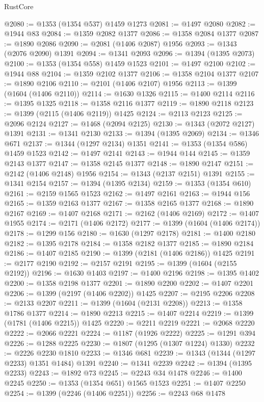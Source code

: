 \begin{lexlean}{RustCore}
\begin{coremodule}
@2080 := @1353 (@1354 @537) @1459 @1273
@2081 := @1497 @2080
@2082 := @1944 @83
@2084 := @1359 @2082 @1377
@2086 := @1358 @2084 @1377
@2087 := @1890 @2086
@2090 := @2081 (@1406 @2087) @1956
@2093 := @1343 (@2076 @2090) @1391
@2094 := @1341 @2093
@2096 := @1394 (@1395 @2073)
@2100 := @1353 (@1354 @558) @1459 @1523
@2101 := @1497 @2100
@2102 := @1944 @88
@2104 := @1359 @2102 @1377
@2106 := @1358 @2104 @1377
@2107 := @1890 @2106
@2110 := @2101 (@1406 @2107) @1956
@2113 := @1399 (@1604 (@1406 @2110))
@2114 := @1630 @1326
@2115 := @1400 @2114
@2116 := @1395 @1325
@2118 := @1358 @2116 @1377
@2119 := @1890 @2118
@2123 := @1399 (@2115 (@1406 @2119)) @1425
@2124 := @2113 @2123
@2125 := @2096 @2124
@2127 := @1468 (@2094 @2125)
@2130 := @1343 (@2072 @2127) @1391
@2131 := @1341 @2130
@2133 := @1394 (@1395 @2069)
@2134 := @1346 @671
@2137 := @1344 (@1297 @2134) @1351
@2141 := @1353 (@1354 @586) @1459 @1523
@2142 := @1497 @2141
@2143 := @1944 @144
@2145 := @1359 @2143 @1377
@2147 := @1358 @2145 @1377
@2148 := @1890 @2147
@2151 := @2142 (@1406 @2148) @1956
@2154 := @1343 (@2137 @2151) @1391
@2155 := @1341 @2154
@2157 := @1394 (@1395 @2134)
@2159 := @1353 (@1354 @610)
@2161 := @2159 @1565 @1523
@2162 := @1497 @2161
@2163 := @1944 @156
@2165 := @1359 @2163 @1377
@2167 := @1358 @2165 @1377
@2168 := @1890 @2167
@2169 := @1407 @2168
@2171 := @2162 (@1406 @2169)
@2172 := @1407 @1955
@2174 := @2171 (@1406 @2172)
@2177 := @1399 (@1604 (@1406 @2174))
@2178 := @1299 @156
@2180 := @1630 (@1297 @2178)
@2181 := @1400 @2180
@2182 := @1395 @2178
@2184 := @1358 @2182 @1377
@2185 := @1890 @2184
@2186 := @1407 @2185
@2190 := @1399 (@2181 (@1406 @2186)) @1425
@2191 := @2177 @2190
@2192 := @2157 @2191
@2195 := @1399 (@1604 (@2155 @2192))
@2196 := @1630 @1403
@2197 := @1400 @2196
@2198 := @1395 @1402
@2200 := @1358 @2198 @1377
@2201 := @1890 @2200
@2202 := @1407 @2201
@2206 := @1399 (@2197 (@1406 @2202)) @1425
@2207 := @2195 @2206
@2208 := @2133 @2207
@2211 := @1399 (@1604 (@2131 @2208))
@2213 := @1358 @1786 @1377
@2214 := @1890 @2213
@2215 := @1407 @2214
@2219 := @1399 (@1781 (@1406 @2215)) @1425
@2220 := @2211 @2219
@2221 := @2068 @2220
@2222 := @2066 @2221
@2224 := @1187 (@1926 @2222)
@2225 := @1291 @394
@2226 := @1288 @2225
@2230 := @1807 (@1295 (@1307 @1224) @1330)
@2232 := @2226 @2230 @1810
@2233 := @1346 @681
@2239 := @1343 (@1344 (@1297 @2233) @1351 @1484) @1391
@2240 := @1341 @2239
@2242 := @1394 (@1395 @2233)
@2243 := @1892 @73
@2245 := @2243 @34 @1478
@2246 := @1400 @2245
@2250 := @1353 (@1354 @651) @1565 @1523
@2251 := @1407 @2250
@2254 := @1399 (@2246 (@1406 @2251))
@2256 := @2243 @68 @1478

\end{coremodule}
\end{lexlean}

